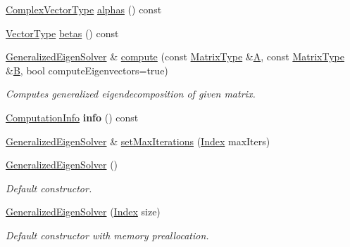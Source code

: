 \begin{DoxyCompactItemize}
\hyperlink{group___eigenvalues___module_acfd144329aca76882069da2fc5d53ef5}{Complex\+Vector\+Type} \hyperlink{group___eigenvalues___module_a82b1bc41267f46e5c5899d5b084a73bb}{alphas} () const
\item 
\hyperlink{group___eigenvalues___module_a5aa3d1390c2b0d455c1c9b8b3101b119}{Vector\+Type} \hyperlink{group___eigenvalues___module_abeaa6f56cee367b83fd09d428462ca0c}{betas} () const
\item 
\hyperlink{group___eigenvalues___module_class_eigen_1_1_generalized_eigen_solver}{Generalized\+Eigen\+Solver} \& \hyperlink{group___eigenvalues___module_a275910b47dfe5f40211dcb59cfd68f3c}{compute} (const \hyperlink{group___eigenvalues___module_a56f4b9823bb9a267de3aaf48428cd247}{Matrix\+Type} \&\hyperlink{group___core___module_class_eigen_1_1_matrix}{A}, const \hyperlink{group___eigenvalues___module_a56f4b9823bb9a267de3aaf48428cd247}{Matrix\+Type} \&\hyperlink{group___core___module_class_eigen_1_1_matrix}{B}, bool compute\+Eigenvectors=true)
\begin{DoxyCompactList}\small\item\em Computes generalized eigendecomposition of given matrix. \end{DoxyCompactList}\item 
\mbox{\label{group___eigenvalues___module_aad204fd80e2633d5693b78916bcda40c}} 
\hyperlink{group__enums_ga85fad7b87587764e5cf6b513a9e0ee5e}{Computation\+Info} {\bfseries info} () const
\item 
\hyperlink{group___eigenvalues___module_class_eigen_1_1_generalized_eigen_solver}{Generalized\+Eigen\+Solver} \& \hyperlink{group___eigenvalues___module_a2a6f96bd042068cfc0eafba839b424bd}{set\+Max\+Iterations} (\hyperlink{group___eigenvalues___module_a46a0ff3841059479ec314e56a5645302}{Index} max\+Iters)
\item 
\hyperlink{group___eigenvalues___module_ae745f39da43f9df192cc2875d82b4cf1}{Generalized\+Eigen\+Solver} ()
\begin{DoxyCompactList}\small\item\em Default constructor. \end{DoxyCompactList}\item 
\hyperlink{group___eigenvalues___module_aab6423ded30275cd4cdd31758c278694}{Generalized\+Eigen\+Solver} (\hyperlink{group___eigenvalues___module_a46a0ff3841059479ec314e56a5645302}{Index} size)
\begin{DoxyCompactList}\small\item\em Default constructor with memory preallocation. \end{DoxyCompactList}\item 

\end{DoxyCompactItemize}
